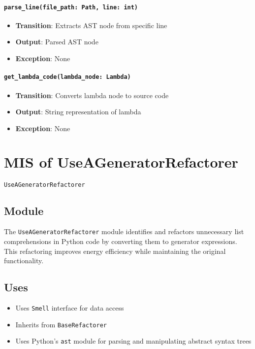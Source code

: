 \documentclass[12pt, titlepage]{article}
\begin{document}
\paragraph{\texttt{parse\_line(file\_path: Path, line: int)}}
\begin{itemize}
\item \textbf{Transition}: Extracts AST node from specific line
\item \textbf{Output}: Parsed AST node
\item \textbf{Exception}: None
\end{itemize}

\paragraph{\texttt{get\_lambda\_code(lambda\_node: Lambda)}}
\begin{itemize}
\item \textbf{Transition}: Converts lambda node to source code
\item \textbf{Output}: String representation of lambda
\item \textbf{Exception}: None
\end{itemize}

\newpage
\section{MIS of UseAGeneratorRefactorer} \label{mis:UseGen}

\texttt{UseAGeneratorRefactorer}

\subsection{Module}

The \texttt{UseAGeneratorRefactorer} module identifies and refactors 
unnecessary list comprehensions in Python code by converting them to generator expressions. This refactoring improves energy efficiency while maintaining the original functionality.

\subsection{Uses}
\begin{itemize}
\item Uses \texttt{Smell} interface for data access
\item Inherits from \texttt{BaseRefactorer}
\item Uses Python's \texttt{ast} module for parsing and manipulating abstract syntax trees
\end{itemize}
\end{document}
